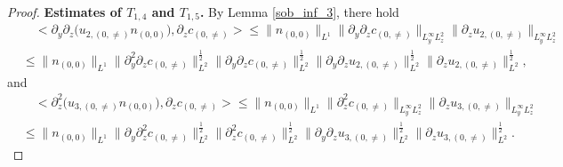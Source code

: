 \documentclass[10pt,a4paper]{amsart}
\begin{document}
\begin{proof}
		
		\textbf{Estimates of $T_{1,4}$ and $T_{1,5}$.}	
		By Lemma \ref{sob_inf_3}, there hold
		\begin{equation}\label{t13_temp1}
			\begin{aligned}
				&\quad<\partial_y\partial_z\big(u_{2,(0,\neq)}n_{(0,0)}\big),\partial_zc_{(0,\neq)}>\leq \|n_{(0,0)}\|_{L^1}
				\|\partial_y\partial_zc_{(0,\neq)}\|_{L^{\infty}_yL^2_z}
				\|\partial_zu_{2,(0,\neq)}\|_{L^{\infty}_yL^2_z}\\
				&\leq \|n_{(0,0)}\|_{L^1}
				\|\partial_y^2\partial_zc_{(0,\neq)}\|^{\frac12}_{L^2}
				\|\partial_y\partial_zc_{(0,\neq)}\|^{\frac12}_{L^2}
				\|\partial_y\partial_zu_{2,(0,\neq)}\|^{\frac12}_{L^2}
				\|\partial_zu_{2,(0,\neq)}\|^{\frac12}_{L^2},
			\end{aligned}
		\end{equation}
		and 
		\begin{equation}\label{t13_temp2}
			\begin{aligned}
				&\quad<\partial_z^2\big(u_{3,(0,\neq)}n_{(0,0)}\big),\partial_zc_{(0,\neq)}>\leq \|n_{(0,0)}\|_{L^1}
				\|\partial_z^2c_{(0,\neq)}\|_{L^{\infty}_yL^2_z}
				\|\partial_zu_{3,(0,\neq)}\|_{L^{\infty}_yL^2_z}\\
				&\leq \|n_{(0,0)}\|_{L^1}
				\|\partial_y\partial_z^2c_{(0,\neq)}\|^{\frac12}_{L^2}
				\|\partial_z^2c_{(0,\neq)}\|^{\frac12}_{L^2}
				\|\partial_y\partial_zu_{3,(0,\neq)}\|^{\frac12}_{L^2}
				\|\partial_zu_{3,(0,\neq)}\|^{\frac12}_{L^2}.
			\end{aligned}
		\end{equation}
		

\end{proof}
\end{document}
